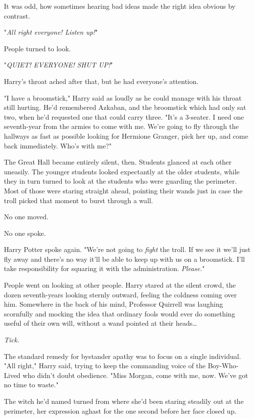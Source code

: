 It was odd, how sometimes hearing bad ideas made the right idea obvious by contrast.

"\emph{All right everyone! Listen up!}"

People turned to look.

"\emph{QUIET! EVERYONE! SHUT UP!}"

Harry's throat ached after that, but he had everyone's attention.

"I have a broomstick," Harry said as loudly as he could manage with his throat still hurting. He'd remembered Azkaban, and the broomstick which had only sat two, when he'd requested one that could carry three. "It's a 3-seater. I need one seventh-year from the armies to come with me. We're going to fly through the hallways as fast as possible looking for Hermione Granger, pick her up, and come back immediately. Who's with me?"

The Great Hall became entirely silent, then.
\sbreak
Students glanced at each other uneasily. The younger students looked expectantly at the older students, while they in turn turned to look at the students who were guarding the perimeter. Most of those were staring straight ahead, pointing their wands just in case the troll picked that moment to burst through a wall.

No one moved.

No one spoke.

Harry Potter spoke again. "We're not going to \emph{fight} the troll. If we see it we'll just fly away and there's no way it'll be able to keep up with us on a broomstick. I'll take responsibility for squaring it with the administration. \emph{Please.}"

People went on looking at other people.
\sbreak
Harry stared at the silent crowd, the dozen seventh-years looking sternly outward, feeling the coldness coming over him. Somewhere in the back of his mind, Professor Quirrell was laughing scornfully and mocking the idea that ordinary fools would ever do something useful of their own will, without a wand pointed at their heads{\ldots}

\emph{Tick.}

The standard remedy for bystander apathy was to focus on a single individual. "All right," Harry said, trying to keep the commanding voice of the Boy-Who-Lived who didn't doubt obedience. "Miss Morgan, come with me, now. We've got no time to waste."

The witch he'd named turned from where she'd been staring steadily out at the perimeter, her expression aghast for the one second before her face closed up.

